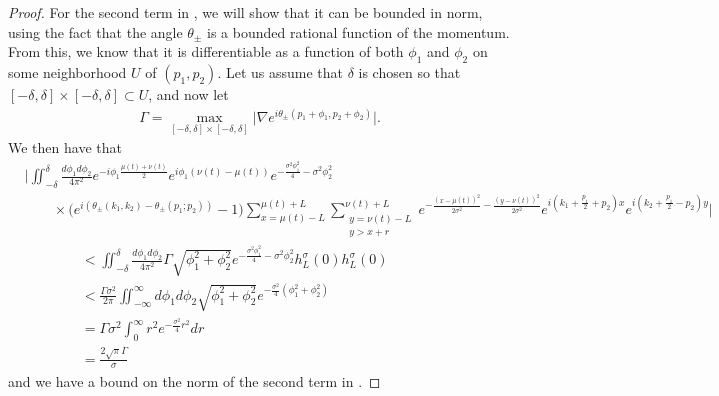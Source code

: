 \documentclass[../thesis-main/thesis-main]{subfiles}
\begin{document}
\begin{proof}
For the second term in , we will show that it can be bounded in norm, using the fact that the angle $\theta_\pm$ is a bounded rational function of the momentum.  From this, we know that it is differentiable as a function of both $\phi_1$ and $\phi_2$ on some neighborhood $U$ of $(p_1,p_2)$.  Let us assume that $\delta$ is chosen so that $[-\delta,\delta]\times [-\delta,\delta] \subset U$, and now let
\begin{align}
  \Gamma = \max_{[-\delta,\delta]\times [-\delta,\delta]} \big|\nabla e^{i \theta_{\pm}(p_1 +\phi_1, p_2 +\phi_2)}\big|.
\end{align}
  We then have that
\begin{align}
  &\Bigg| \iint_{-\delta}^\delta \frac{d\phi_1d\phi_2}{4\pi^2} e^{-i \phi_1 \frac{\mu(t) + \nu(t)}{2}} e^{i \phi_1(\nu(t) - \mu(t))} e^{-\frac{\sigma^2 \phi_1^2}{4} - \sigma^2 \phi_2^2} \nonumber\\
  & \qquad \times \Big(e^{i(\theta_{\pm}(k_1,k_2) - \theta_{\pm}(p_1;p_2))} - 1\Big)\sum_{x=\mu(t)-L}^{\mu(t)+L} \sum_{\substack{y=\nu(t)-L\\y>x+r}}^{\nu(t)+L} e^{-\frac{(x-\mu(t))^2}{2\sigma^2} - \frac{(y-\nu(t))^2}{2\sigma^2}} e^{i (k_1 + \frac{p_1}{2} + p_2)x}e^{i(k_2 + \frac{p_1}{2} - p_2)y} \Bigg|\nonumber\\
  &\qquad \qquad < \iint_{-\delta}^\delta \frac{d\phi_1d\phi_2}{4\pi^2} \Gamma \sqrt{\phi_1^2 +\phi_2^2} e^{-\frac{\sigma^2 \phi_1^2}{4} - \sigma^2 \phi_2^2}h_L^\sigma (0) h_L^\sigma(0)\\
  &\qquad \qquad < \frac{\Gamma\sigma^2}{2\pi} \iint_{-\infty}^\infty d\phi_1 d\phi_2 \sqrt{\phi_1^2 + \phi_2^2} e^{-\frac{\sigma^2}{4} (\phi_1^2 + \phi_2^2)}\\
  &\qquad \qquad = \Gamma\sigma^2 \int_{0}^\infty r^2 e^{-\frac{\sigma^2}{4}r^2} dr\\
  &\qquad \qquad = \frac{2\sqrt{\pi}\Gamma}{\sigma}
\end{align}
and we have a bound on the norm of the second term in .


\end{proof}
\end{document}
